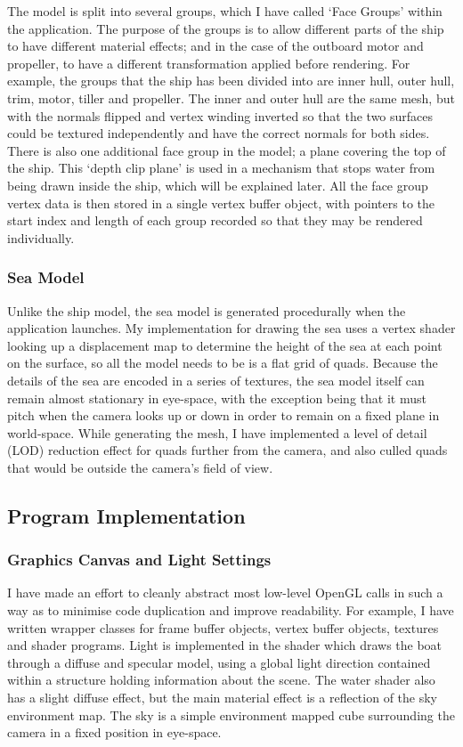 \documentclass[a4paper,11pt]{article}
\begin{document}
The model is split into several groups, which I have called `Face Groups' within the application. The purpose of the groups is to allow different parts of the ship to have different material effects; and in the case of the outboard motor and propeller, to have a different transformation applied before rendering. For example, the groups that the ship has been divided into are inner hull, outer hull, trim, motor, tiller and propeller. The inner and outer hull are the same mesh, but with the normals flipped and vertex winding inverted so that the two surfaces could be textured independently and have the correct normals for both sides. There is also one additional face group in the model; a plane covering the top of the ship. This `depth clip plane' is used in a mechanism that stops water from being drawn inside the ship, which will be explained later. All the face group vertex data is then stored in a single vertex buffer object, with pointers to the start index and length of each group recorded so that they may be rendered individually.

\subsubsection{Sea Model}
Unlike the ship model, the sea model is generated procedurally when the application launches. My implementation for drawing the sea uses a vertex shader looking up a displacement map to determine the height of the sea at each point on the surface, so all the model needs to be is a flat grid of quads. Because the details of the sea are encoded in a series of textures, the sea model itself can remain almost stationary in eye-space, with the exception being that it must pitch when the camera looks up or down in order to remain on a fixed plane in world-space. While generating the mesh, I have implemented a level of detail (LOD) reduction effect for quads further from the camera, and also culled quads that would be outside the camera's field of view.

\subsection{Program Implementation}
\subsubsection{Graphics Canvas and Light Settings}
I have made an effort to cleanly abstract most low-level OpenGL calls in such a way as to minimise code duplication and improve readability. For example, I have written wrapper classes for frame buffer objects, vertex buffer objects, textures and shader programs. Light is implemented in the shader which draws the boat through a diffuse and specular model, using a global light direction contained within a structure holding information about the scene. The water shader also has a slight diffuse effect, but the main material effect is a reflection of the sky environment map. The sky is a simple environment mapped cube surrounding the camera in a fixed position in eye-space.
\end{document}
